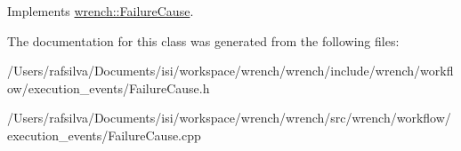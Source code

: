 Implements \hyperlink{classwrench_1_1_failure_cause_afbad248ebe902409f2cd4f1d6f2b867d}{wrench\+::\+Failure\+Cause}.



The documentation for this class was generated from the following files\+:\begin{DoxyCompactItemize}
\item 
/\+Users/rafsilva/\+Documents/isi/workspace/wrench/wrench/include/wrench/workflow/execution\+\_\+events/Failure\+Cause.\+h\item 
/\+Users/rafsilva/\+Documents/isi/workspace/wrench/wrench/src/wrench/workflow/execution\+\_\+events/Failure\+Cause.\+cpp\end{DoxyCompactItemize}
